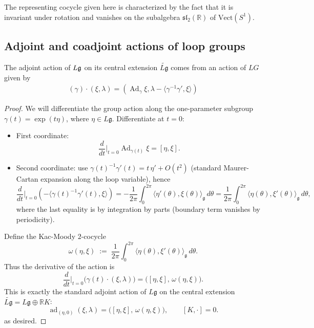 \documentclass[12pt]{article}
\begin{document}
The representing cocycle given here is characterized by the fact that it is invariant under rotation and vanishes on the subalgebra $\mathfrak{sl}_2(\mathbb{R})$ of
$\mathrm{Vect}(S^1)$.

\subsection{Adjoint and coadjoint actions of loop groups}
\begin{proposition}
    The adjoint action of $L\mathfrak{g}$ on its central extension $\widetilde{L\mathfrak{g}}$ comes from an action of $LG$ given by \begin{align*}
        (\gamma)\cdot(\xi,\lambda) = (\operatorname{Ad}_\gamma \xi, \lambda - \langle \gamma^{-1}\gamma', \xi \rangle)
    \end{align*}
\end{proposition}

\begin{proof}
    We will differentiate the group action along the one-parameter subgroup $\gamma(t) = \exp(t\eta)$, where $\eta \in L\mathfrak{g}$. Differentiate at $t=0$:
    \begin{itemize}
        \item First coordinate:
              \[
                  \frac{d}{dt}\Big|_{t=0}\operatorname{Ad}_{\gamma(t)}\xi
                  = [\eta,\xi].
              \]
        \item Second coordinate: use $\gamma(t)^{-1}\gamma'(t)=t\,\eta'+O(t^2)$ (standard Maurer-Cartan expansion along the loop variable), hence
              \[
                  \frac{d}{dt}\Big|_{t=0}\!\left(-\big\langle\gamma(t)^{-1}\gamma'(t),\xi\big\rangle\right)
                  = -\frac{1}{2\pi}\int_0^{2\pi}\!\langle \eta'(\theta),\xi(\theta)\rangle_{\mathfrak g}\,d\theta
                  = \frac{1}{2\pi}\int_0^{2\pi}\!\langle \eta(\theta),\xi'(\theta)\rangle_{\mathfrak g}\,d\theta,
              \]
              where the last equality is by integration by parts (boundary term vanishes by periodicity).
    \end{itemize}

    Define the Kac-Moody $2$-cocycle
    \[
        \omega(\eta,\xi)\;:=\;\frac{1}{2\pi}\int_0^{2\pi}\!\langle \eta(\theta),\xi'(\theta)\rangle_{\mathfrak g}\,d\theta.
    \]
    Thus the derivative of the action is
    \[
        \frac{d}{dt}\Big|_{t=0}\big(\gamma(t)\cdot(\xi,\lambda)\big)
        = \big([\eta,\xi],\,\omega(\eta,\xi)\big).
    \]
    This is exactly the standard adjoint action of $L\mathfrak g$ on the central extension $\widetilde{L\mathfrak g}=L\mathfrak g\oplus\mathbb R K$:
    \[
        \operatorname{ad}_{(\eta,0)}(\xi,\lambda)=\big([\eta,\xi],\,\omega(\eta,\xi)\big),\qquad [K,\cdot]=0.
    \] as desired.
\end{proof}
\end{document}
